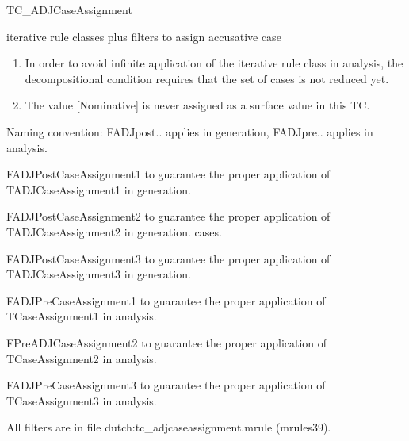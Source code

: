 \begin{mruleclass}{TC\_ADJCaseAssignment}
\begin{classdescr}
\kind iterative rule classes plus filters
\classtask to assign accusative case
\classremarks \mbox{}
\begin{enumerate}
\item
In order to avoid infinite application of the iterative rule class
in analysis, the decompositional condition requires 
that the set of cases is not reduced yet.
\item
The value [Nominative] is never assigned as a surface value in 
this TC.
\end{enumerate}
\begin{filters}
\item Naming convention: FADJpost.. applies in generation, FADJpre.. applies in 
analysis.

\begin{member}
 FADJPostCaseAssignment1
 to guarantee the proper application of TADJCaseAssignment1 in 
generation.

\end{member}
\begin{member}
 FADJPostCaseAssignment2
 to guarantee the proper application of TADJCaseAssignment2 in 
generation.
cases.

\end{member}
\begin{member}
 FADJPostCaseAssignment3
 to guarantee the proper application of TADJCaseAssignment3 in 
generation.

\end{member}
\begin{member}
 FADJPreCaseAssignment1
 to guarantee the proper application of TCaseAssignment1 in 
analysis.

\end{member}
\begin{member}
 FPreADJCaseAssignment2
 to guarantee the proper application of TCaseAssignment2 in 
analysis.
\end{member}
\begin{member}
 FADJPreCaseAssignment3
 to guarantee the proper application of TCaseAssignment3 in 
analysis.
\end{member}

\item All filters are in file dutch:tc\_adjcaseassignment.mrule (mrules39).
\end{filters}


\end{classdescr}
\end{mruleclass}
